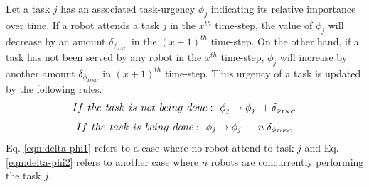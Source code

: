 \documentclass[final,5p,times,twocolumn]{elsarticle}
\begin{document}
Let a task $j$ has an associated task-urgency $\phi_j$ indicating its relative importance over time.
If a robot attends a task $j$ in the $x^{th}$ time-step, the value of $\phi_j$ will decrease by an amount $\delta_{\phi_{INC}}$ in the $(x+1)^{th}$ time-step.
On the other hand, if a task has not been served by any robot in the $x^{th}$ time-step, $\phi_j$ will increase by another amount  $\delta_{\phi_{DEC}}$  in $(x+1)^{th}$ time-step. Thus
urgency of a task is updated by the following rules.
\begin{equation}
 If\hspace*{0.15cm}the\hspace*{0.15cm} task\hspace*{0.15cm}is\hspace*{0.15cm}not\hspace*{0.15cm}being\hspace*{0.15cm} done:\hspace*{0.15cm}  \phi_j \rightarrow   \phi_j \hspace*{0.15cm} + \delta_{\phi_{INC}}
\label{eqn:delta-phi1}
\end{equation}
\begin{equation}
 If\hspace*{0.15cm}the \hspace*{0.15cm}task\hspace*{0.15cm}is\hspace*{0.15cm}being\hspace*{0.15cm}done:\hspace*{0.15cm}  \phi_j \rightarrow   \phi_j \hspace*{0.15cm} - n\hspace*{0.10cm}\delta_{\phi_{DEC}}
\label{eqn:delta-phi2}
\end{equation}
Eq. \ref{eqn:delta-phi1} refers to a case where no robot attend to task $j$ and Eq. \ref{eqn:delta-phi2} refers to another case where $n$ robots are concurrently performing the task $j$.
\end{document}
